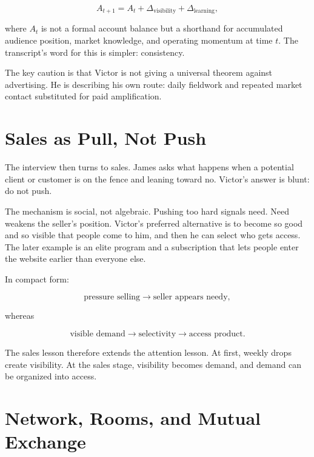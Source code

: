 \begin{equation}
A_{t+1} = A_t + \Delta_{\text{visibility}} + \Delta_{\text{learning}},
\end{equation}

where \(A_t\) is not a formal account balance but a shorthand for accumulated audience position, market knowledge, and operating momentum at time \(t\). The transcript's word for this is simpler: consistency.

The key caution is that Victor is not giving a universal theorem against advertising. He is describing his own route: daily fieldwork and repeated market contact substituted for paid amplification.

\section{Sales as Pull, Not Push}

The interview then turns to sales. James asks what happens when a potential client or customer is on the fence and leaning toward no. Victor's answer is blunt: do not push.

The mechanism is social, not algebraic. Pushing too hard signals need. Need weakens the seller's position. Victor's preferred alternative is to become so good and so visible that people come to him, and then he can select who gets access. The later example is an elite program and a subscription that lets people enter the website earlier than everyone else.

In compact form:

\begin{equation}
\text{pressure selling}
\longrightarrow
\text{seller appears needy},
\end{equation}

whereas

\begin{equation}
\text{visible demand}
\longrightarrow
\text{selectivity}
\longrightarrow
\text{access product}.
\end{equation}

The sales lesson therefore extends the attention lesson. At first, weekly drops create visibility. At the sales stage, visibility becomes demand, and demand can be organized into access.

\section{Network, Rooms, and Mutual Exchange}

